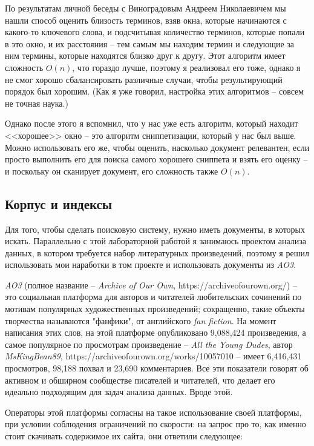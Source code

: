 \documentclass[a4page]{article}
\let\Oldsubsection\subsection
\renewcommand{\subsection}{\FloatBarrier\Oldsubsection}
\begin{document}
По результатам личной беседы с Виноградовым Андреем Николаевичем мы нашли способ оценить близость терминов, взяв окна, которые начинаются с какого-то ключевого слова, и подсчитывая количество терминов, которые попали в это окно, и их расстояния -- тем самым мы находим термин и следующие за ним термины, которые находятся близко друг к другу. Этот алгоритм имеет сложность $O(n)$, что гораздо лучше, поэтому я реализовал его тоже, однако я не смог хорошо сбалансировать различные случаи, чтобы результирующий порядок был хорошим. (Как я уже говорил, настройка этих алгоритмов -- совсем не точная наука.)

Однако после этого я вспомнил, что у нас уже есть алгоритм, который находит <<хорошее>> окно -- это алгоритм сниппетизации, который у нас был выше. Можно использовать его же, чтобы оценить, насколько документ релевантен, если просто выполнить его для поиска самого хорошего сниппета и взять его оценку -- и поскольку он сканирует документ, его сложность также $O(n)$.

\subsection{Корпус и индексы}
\newcommand{\aot}{\textit{AO3}}

Для того, чтобы сделать поисковую систему, нужно иметь документы, в которых искать. Параллельно с этой лабораторной работой я занимаюсь проектом анализа данных, в котором требуется набор литературных произведений, поэтому я решил использовать мои наработки в том проекте и использовать документы из \aot{}.

\aot{} (полное название -- \textit{Archive of Our Own}, https://archiveofourown.org/) -- это социальная платформа для авторов и читателей любительских сочинений по мотивам популярных художественных произведений; сокращенно, такие объекты творчества называются "фанфики", от английского \textit{fan fiction}. На момент написания этих слов, на этой платформе опубликовано 9,088,424 произведения, а самое популярное по просмотрам произведение --  \textit{All the Young Dudes}, автор \textit{MsKingBean89}, https://archiveofourown.org/works/10057010 --  имеет 6,416,431 просмотров, 98,188 похвал и 23,690 комментариев. Все эти показатели говорят об активном и обширном сообществе писателей и читателей, что делает его идеально подходящим для задач анализа данных. Вроде этой.

Операторы этой платформы согласны на такое использование своей платформы, при условии соблюдения ограничений по скорости: на запрос про то, как именно стоит скачивать содержимое их сайта, они ответили следующее:
\end{document}
